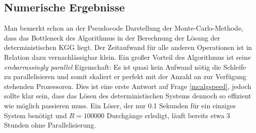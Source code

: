 \subsection{Numerische Ergebnisse}
Man bemerkt schon an der Pseudocode Darstellung der Monte-Carlo-Methode, dass das Bottleneck des Algorithmus in der Berechnung der Lösung der deterministischen KGG liegt. Der Zeitaufwand für alle anderen Operationen ist in Relation dazu vernachlässigbar klein. Ein großer Vorteil des Algorithmus ist seine \emph{embarrassingly parallel} Eigenschaft: Es ist quasi kein Aufwand nötig die Schleife zu parallelisieren und somit skaliert er perfekt mit der Anzahl an zur Verfügung stehenden Prozessoren. Dies ist eine erste Antwort auf Frage \ref{mcalgspeed}, jedoch sollte klar sein, dass das Lösen des deterministischen Systems dennoch so effizient wie möglich passieren muss. Ein Löser, der nur 0.1 Sekunden für ein einziges System benötigt und $R=100000$ Durchgänge erledigt, läuft bereits etwa 3 Stunden ohne Parallelisierung.\\


